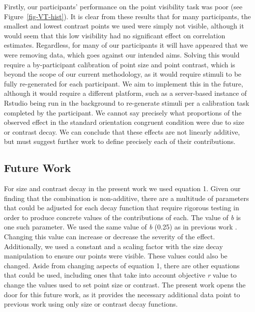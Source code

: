 \documentclass[manuscript, review, anonymous, screen]{acmart}
\begin{document}
Firstly, our participants' performance on the point visibility task was
poor (see Figure~\ref{fig-VT-hist}). It is clear from these results that
for many participants, the smallest and lowest contrast points we used
were simply not visible, although it would seem that this low visibility
had no significant effect on correlation estimates. Regardless, for many
of our participants it will have appeared that we were removing data,
which goes against our intended aims. Solving this would require a
by-participant calibration of point size and point contrast, which is
beyond the scope of our current methodology, as it would require stimuli
to be fully re-generated for each participant. We aim to implement this
in the future, although it would require a different platform, such as a
server-based instance of Rstudio being run in the background to
re-generate stimuli per a calibration task completed by the participant.
We cannot say precisely what proportions of the observed effect in the
standard orientation congruent condition were due to size or contrast
decay. We can conclude that these effects are not linearly additive, but
must suggest further work to define precisely each of their
contributions.

\hypertarget{sec-future-work}{%
\subsection{Future Work}\label{sec-future-work}}

For size and contrast decay in the present work we used equation 1.
Given our finding that the combination is non-additive, there are a
multitude of parameters that could be adjusted for each decay function
that require rigorous testing in order to produce concrete values of the
contributions of each. The value of \emph{b} is one such parameter. We
used the same value of \emph{b} (0.25) as in previous work
\citep{Strain_2023, strain_2023b}. Changing this value can increase or
decrease the severity of the effect. Additionally, we used a constant
and a scaling factor with the size decay manipulation to ensure our
points were visible. These values could also be changed. Aside from
changing aspects of equation 1, there are other equations that could be
used, including ones that take into account objective \emph{r} value to
change the values used to set point size or contrast. The present work
opens the door for this future work, as it provides the necessary
additional data point to previous work using only size
\citep{strain_2023b} or contrast \citep{strain_2023} decay functions.




\end{document}
